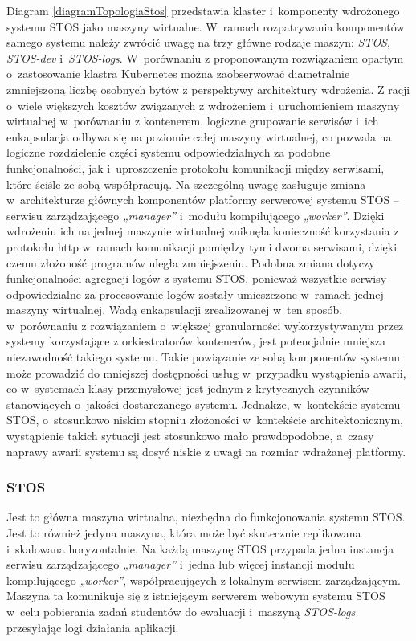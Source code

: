 \noindent Diagram \ref{diagramTopologiaStos} przedstawia klaster i~komponenty wdrożonego systemu STOS jako maszyny wirtualne. W~ramach rozpatrywania komponentów samego systemu należy zwrócić uwagę na trzy główne rodzaje maszyn: \textit{STOS}, \textit{STOS-dev} i~\textit{STOS-logs}. W~porównaniu z proponowanym rozwiązaniem opartym o~zastosowanie klastra Kubernetes można zaobserwować diametralnie zmniejszoną liczbę osobnych bytów z perspektywy architektury wdrożenia. Z racji o~wiele większych kosztów związanych z wdrożeniem i~uruchomieniem maszyny wirtualnej w~porównaniu z kontenerem, logiczne grupowanie serwisów i~ich enkapsulacja odbywa się na poziomie całej maszyny wirtualnej, co pozwala na logiczne rozdzielenie części systemu odpowiedzialnych za podobne funkcjonalności, jak i~uproszczenie protokołu komunikacji między serwisami, które ściśle ze sobą współpracują. Na szczególną uwagę zasługuje zmiana w~architekturze głównych komponentów platformy serwerowej systemu STOS -- serwisu zarządzającego \textit{„manager”} i~modułu kompilującego \textit{„worker”}. Dzięki wdrożeniu ich na jednej maszynie wirtualnej zniknęła konieczność korzystania z protokołu http w~ramach komunikacji pomiędzy tymi dwoma serwisami, dzięki czemu złożoność programów uległa zmniejszeniu. Podobna zmiana dotyczy funkcjonalności agregacji logów z systemu STOS, ponieważ wszystkie serwisy odpowiedzialne za procesowanie logów zostały umieszczone w~ramach jednej maszyny wirtualnej.
\noindent Wadą enkapsulacji zrealizowanej w~ten sposób, w~porównaniu z rozwiązaniem o~większej granularności wykorzystywanym przez systemy korzystające z orkiestratorów kontenerów, jest potencjalnie mniejsza niezawodność takiego systemu. Takie powiązanie ze sobą komponentów systemu może prowadzić do mniejszej dostępności usług w~przypadku wystąpienia awarii, co w~systemach klasy przemysłowej jest jednym z krytycznych czynników stanowiących o~jakości dostarczanego systemu. Jednakże, w~kontekście systemu STOS, o~stosunkowo niskim stopniu złożoności w~kontekście architektonicznym, wystąpienie takich sytuacji jest stosunkowo mało prawdopodobne, a~czasy naprawy awarii systemu są dosyć niskie z uwagi na rozmiar wdrażanej platformy.

\subsubsection{STOS}
Jest to główna maszyna wirtualna, niezbędna do funkcjonowania systemu STOS. Jest to również jedyna maszyna, która może być skutecznie replikowana i~skalowana horyzontalnie. Na każdą maszynę STOS przypada jedna instancja serwisu zarządzającego \textit{„manager”} i~jedna lub więcej instancji modułu kompilującego \textit{„worker”}, współpracujących z lokalnym serwisem zarządzającym. Maszyna ta komunikuje się z istniejącym serwerem webowym systemu STOS w~celu pobierania zadań studentów do ewaluacji i~maszyną \textit{STOS-logs} przesyłając logi działania aplikacji.

